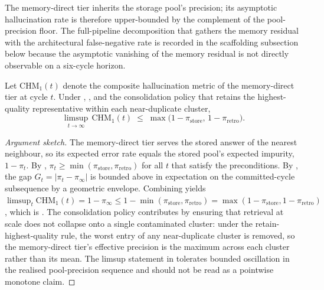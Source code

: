 The memory-direct tier inherits the storage pool's precision; its asymptotic hallucination rate is therefore upper-bounded by the complement of the pool-precision floor. The full-pipeline decomposition that gathers the memory residual with the architectural false-negative rate is recorded in the scaffolding subsection below because the asymptotic vanishing of the memory residual is not directly observable on a six-cycle horizon.

\begin{heuristic}
\label{cor:tier1-floor}
Let $\mathrm{CHM}_{1}(t)$ denote the composite hallucination metric of the memory-direct tier at cycle $t$. Under , , and the consolidation policy that retains the highest-quality representative within each near-duplicate cluster,
\begin{equation}
\limsup_{t\to\infty}\, \mathrm{CHM}_{1}(t) \;\le\; \max\!\big(1-\pi_{\text{store}},\,1-\pi_{\text{retro}}\big).
\label{eq:thm-asymptotic}
\end{equation}
\end{heuristic}

\begin{proof}[Argument sketch]
The memory-direct tier serves the stored answer of the nearest neighbour, so its expected error rate equals the stored pool's expected impurity, $1 - \pi_{t}$. By , $\pi_{t} \ge \min(\pi_{\text{store}}, \pi_{\text{retro}})$ for all $t$ that satisfy the preconditions. By , the gap $G_{t} = |\pi_{t} - \pi_{\infty}|$ is bounded above in expectation on the committed-cycle subsequence by a geometric envelope. Combining yields
\(\limsup_{t} \mathrm{CHM}_{1}(t) = 1 - \pi_{\infty} \le 1 - \min(\pi_{\text{store}}, \pi_{\text{retro}}) = \max(1-\pi_{\text{store}}, 1-\pi_{\text{retro}})\),
which is . The consolidation policy contributes by ensuring that retrieval at scale does not collapse onto a single contaminated cluster: under the retain-highest-quality rule, the worst entry of any near-duplicate cluster is removed, so the memory-direct tier's effective precision is the maximum across each cluster rather than its mean. The limsup statement in  tolerates bounded oscillation in the realised pool-precision sequence and should not be read as a pointwise monotone claim.
\end{proof}

